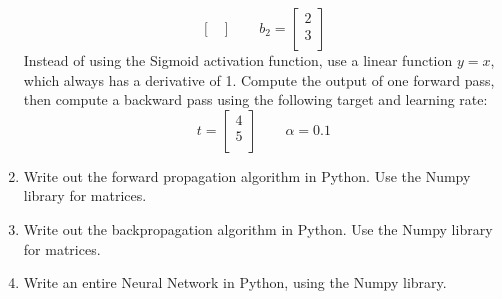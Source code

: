 \documentclass{article}
\begin{document}
\begin{enumerate}
\[\begin{bmatrix}
    \end{bmatrix}
    \qquad
    b_2 = 
    \begin{bmatrix}
        2 \\
        3 \\
    \end{bmatrix}
    \]
    Instead of using the Sigmoid activation function, use a linear function $y=x$, which always has a derivative of 1. Compute the output of one forward pass, then compute a backward pass using the following target and learning rate:
    \[
        t = 
    \begin{bmatrix}
        4 \\
        5 \\
    \end{bmatrix}
    \qquad
    \alpha = 0.1
    \]
    \item Write out the forward propagation algorithm in Python. Use the Numpy library for matrices.
    \item Write out the backpropagation algorithm in Python. Use the Numpy library for matrices.
    \item Write an entire Neural Network in Python, using the Numpy library.
\end{enumerate}
\end{document}

